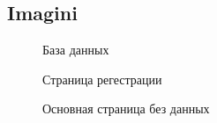 \subsection{Imagini}

\begin{figure}[h]
	\caption{База данных}
	\label{ris:image}
\end{figure}
\hfill
\begin{figure}[h]
	\caption{Страница регестрации}
	\label{ris:image}
\end{figure}
\hfill
\begin{figure}[h]
	\caption{Основная страница без данных}
	\label{ris:image}
\end{figure}
